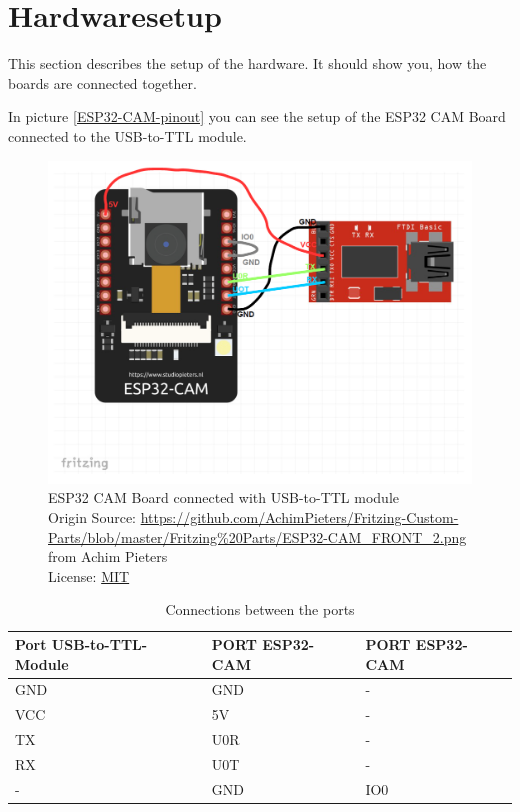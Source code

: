 \graphicspath{ {./hardware_installation/pictures/} }
\section{Hardwaresetup}
This section describes the setup of the hardware. It should show you,
how the boards are connected together.

In picture \ref{ESP32-CAM-pinout} you can see the setup of the ESP32 CAM Board connected to the USB-to-TTL module.

\begin{figure}[H]
\centering
\includegraphics[width=\textwidth]{esp32_cam-ftdi}
\caption[ESP32 CAM Board connected with USB-to-TTL module]{ESP32 CAM Board connected with USB-to-TTL module \\ Origin Source: \url{https://github.com/AchimPieters/Fritzing-Custom-Parts/blob/master/Fritzing\%20Parts/ESP32-CAM_FRONT_2.png}\\ from Achim Pieters \\ License: \href{https://opensource.org/licenses/MIT}{MIT}}
\label{ESP32-CAM-USB-TO-TTL}
\end{figure}

\begin{table}[H]
\begin{tabular}{|l|l|l|}
\hline
Port USB-to-TTL-Module & PORT ESP32-CAM & PORT ESP32-CAM \\ \hline
GND                    & GND            & -              \\ \hline
VCC                    & 5V             & -              \\ \hline
TX                     & U0R            & -              \\ \hline
RX                     & U0T            & -              \\ \hline
-                      & GND            & IO0            \\ \hline
\end{tabular}
\caption{\label{tab:Port-Connections}Connections between the ports}
\end{table}